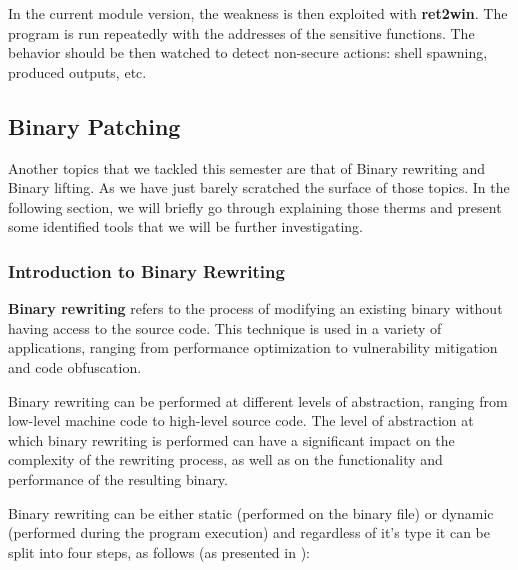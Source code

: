 \documentclass[12pt,a4paper,english,onecolumn]{IEEEtran}
\begin{document}
In the current module version, the weakness is then exploited with \textbf{ret2win}. The program is run repeatedly with the addresses of the sensitive functions. The behavior should be then watched to detect non-secure actions: shell spawning, produced outputs, etc.

\subsection{Binary Patching}

Another topics that we tackled this semester are that of Binary rewriting and Binary lifting. As we have just barely scratched the surface of those topics. In the following section, we will briefly go through explaining those therms and present some identified tools that we will be further investigating.

\subsubsection{Introduction to Binary Rewriting}

\textbf{Binary rewriting} \cite{hack_to_elaborate} refers to the process of modifying an existing binary without having access to the source code. This technique is used in a variety of applications, ranging from performance optimization to vulnerability mitigation and code obfuscation.

Binary rewriting can be performed at different levels of abstraction, ranging from low-level machine code to high-level source code. The level of abstraction at which binary rewriting is performed can have a significant impact on the complexity of the rewriting process, as well as on the functionality and performance of the resulting binary.

Binary rewriting can be either static (performed on the binary file) or dynamic (performed during the program execution) and regardless of it's type it can be split into four steps, as follows (as presented in \cite{hack_to_elaborate}):
\end{document}
